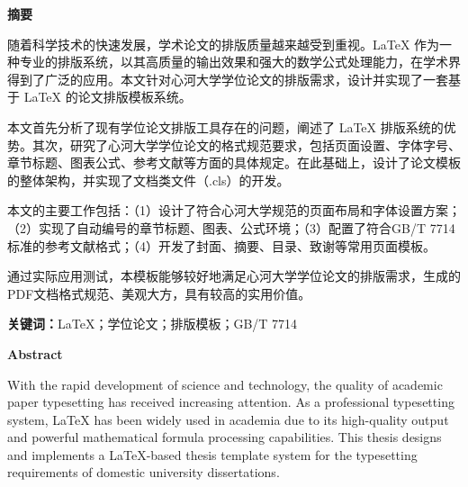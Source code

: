
\begin{center}
    {\sanhao\sffamily\bfseries 摘\quad 要}
\end{center}

\vspace{0.5cm}

随着科学技术的快速发展，学术论文的排版质量越来越受到重视。LaTeX 作为一种专业的排版系统，以其高质量的输出效果和强大的数学公式处理能力，在学术界得到了广泛的应用。本文针对心河大学学位论文的排版需求，设计并实现了一套基于 LaTeX 的论文排版模板系统。

本文首先分析了现有学位论文排版工具存在的问题，阐述了 LaTeX 排版系统的优势。其次，研究了心河大学学位论文的格式规范要求，包括页面设置、字体字号、章节标题、图表公式、参考文献等方面的具体规定。在此基础上，设计了论文模板的整体架构，并实现了文档类文件（.cls）的开发。

本文的主要工作包括：（1）设计了符合心河大学规范的页面布局和字体设置方案；（2）实现了自动编号的章节标题、图表、公式环境；（3）配置了符合GB/T 7714标准的参考文献格式；（4）开发了封面、摘要、目录、致谢等常用页面模板。

通过实际应用测试，本模板能够较好地满足心河大学学位论文的排版需求，生成的PDF文档格式规范、美观大方，具有较高的实用价值。

\vspace{1cm}
\noindent\textbf{关键词：}LaTeX；学位论文；排版模板；GB/T 7714

\newpage

\begin{center}
    {\sanhao\bfseries Abstract}
\end{center}

\vspace{0.5cm}

With the rapid development of science and technology, the quality of academic paper typesetting has received increasing attention. As a professional typesetting system, LaTeX has been widely used in academia due to its high-quality output and powerful mathematical formula processing capabilities. This thesis designs and implements a LaTeX-based thesis template system for the typesetting requirements of domestic university dissertations.

